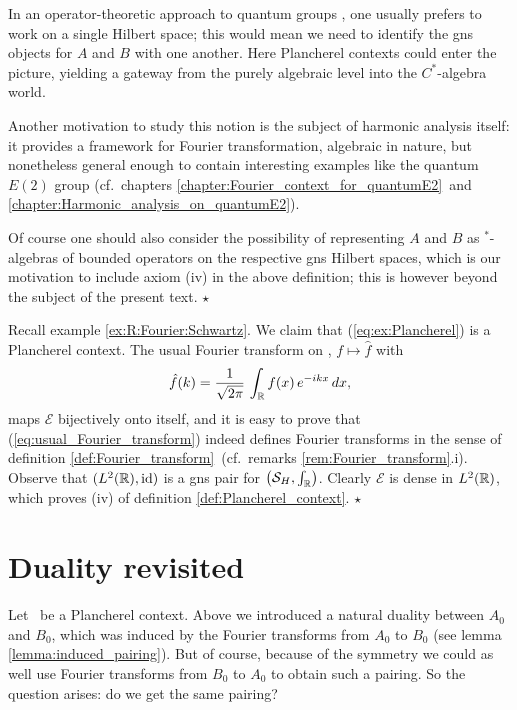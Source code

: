 \begin{remark_sec} \label{rem:Plancherel_context} \rm
In an operator-theoretic approach to quantum groups \cite{KV}, one usually
prefers to work on a single Hilbert space; this would mean we need
to identify the {\sc gns} objects for $A$ and $B$ with one another.
Here Plancherel contexts could enter the picture, yielding a gateway
from the purely algebraic level into the $C^*$-algebra world.

Another motivation to study this notion is the subject of harmonic
analysis itself: it provides a framework for Fourier
transformation, algebraic in nature, but nonetheless general
enough to contain interesting examples like the quantum $E(2)$ group
(cf.\ chapters \ref{chapter:Fourier_context_for_quantumE2}\ and
               \ref{chapter:Harmonic_analysis_on_quantumE2}).

Of course one should also consider the possibility of representing $A$ and $B$
as $^*$-algebras of bounded operators on the respective {\sc gns} Hilbert spaces,
which is our motivation to include axiom (iv) in the above definition;
this is however beyond the subject of the present text.
\hfill $\star$
\end{remark_sec}


\begin{ex_sec} \rm
Recall example \ref{ex:R:Fourier:Schwartz}\@.
We claim that (\ref{eq:ex:Plancherel}) is a Plancherel context.
The usual Fourier transform on \RR, $f \mapsto \hat{f}$ with
\begin{equation}\label{eq:usual_Fourier_transform}
  \hat{f}(k) = \frac{1}{\sqrt{2\pi}} \, \int_{\mathbb{R}} f(x)\,e^{-ikx}\, dx,
\end{equation}
maps $\mathcal E$ bijectively onto itself, and it is easy to prove
that (\ref{eq:usual_Fourier_transform}) indeed defines Fourier transforms in the
sense of definition \ref{def:Fourier_transform}\
(cf.\ remarks \ref{rem:Fourier_transform}.i).
Observe that $(L^2(\mathbb{R}), \mbox{\rm id})$ is a {\sc gns} pair for
$\left({\mathcal S}_H, {\textstyle \int_{\mathbb{R}}}\right)$. Clearly $\mathcal E$
is dense in $L^2(\mathbb{R})$, which proves (iv) of definition \ref{def:Plancherel_context}.
\hfill $\star$
\end{ex_sec}



\section{Duality revisited}

Let \FourierBABA\ be a Plancherel context.
Above we introduced a natural duality between $A_0$ and $B_0$,
which was induced by the Fourier transforms from $A_0$ to $B_0$
(see lemma \ref{lemma:induced_pairing}).
But of course, because of the symmetry we could as well use
Fourier transforms from $B_0$ to $A_0$ to obtain such a pairing.
So the question arises: do we get the same pairing?



